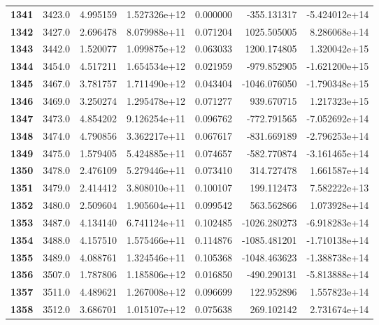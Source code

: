 \documentclass{report}[12pt]
\begin{document}
\begin{center}
\begin{tabular}{lrrrrrr}
\textbf{1341} &         3423.0 &   4.995159 &  1.527326e+12 &    0.000000 &  -355.131317 & -5.424012e+14 \\
\textbf{1342} &         3427.0 &   2.696478 &  8.079988e+11 &    0.071204 &  1025.505005 &  8.286068e+14 \\
\textbf{1343} &         3442.0 &   1.520077 &  1.099875e+12 &    0.063033 &  1200.174805 &  1.320042e+15 \\
\textbf{1344} &         3454.0 &   4.517211 &  1.654534e+12 &    0.021959 &  -979.852905 & -1.621200e+15 \\
\textbf{1345} &         3467.0 &   3.781757 &  1.711490e+12 &    0.043404 & -1046.076050 & -1.790348e+15 \\
\textbf{1346} &         3469.0 &   3.250274 &  1.295478e+12 &    0.071277 &   939.670715 &  1.217323e+15 \\
\textbf{1347} &         3473.0 &   4.854202 &  9.126254e+11 &    0.096762 &  -772.791565 & -7.052692e+14 \\
\textbf{1348} &         3474.0 &   4.790856 &  3.362217e+11 &    0.067617 &  -831.669189 & -2.796253e+14 \\
\textbf{1349} &         3475.0 &   1.579405 &  5.424885e+11 &    0.074657 &  -582.770874 & -3.161465e+14 \\
\textbf{1350} &         3478.0 &   2.476109 &  5.279446e+11 &    0.073410 &   314.727478 &  1.661587e+14 \\
\textbf{1351} &         3479.0 &   2.414412 &  3.808010e+11 &    0.100107 &   199.112473 &  7.582222e+13 \\
\textbf{1352} &         3480.0 &   2.509604 &  1.905604e+11 &    0.099542 &   563.562866 &  1.073928e+14 \\
\textbf{1353} &         3487.0 &   4.134140 &  6.741124e+11 &    0.102485 & -1026.280273 & -6.918283e+14 \\
\textbf{1354} &         3488.0 &   4.157510 &  1.575466e+11 &    0.114876 & -1085.481201 & -1.710138e+14 \\
\textbf{1355} &         3489.0 &   4.088761 &  1.324546e+11 &    0.105368 & -1048.463623 & -1.388738e+14 \\
\textbf{1356} &         3507.0 &   1.787806 &  1.185806e+12 &    0.016850 &  -490.290131 & -5.813888e+14 \\
\textbf{1357} &         3511.0 &   4.489621 &  1.267008e+12 &    0.096699 &   122.952896 &  1.557823e+14 \\
\textbf{1358} &         3512.0 &   3.686701 &  1.015107e+12 &    0.075638 &   269.102142 &  2.731674e+14 \\

\end{tabular}
\end{center}
\end{document}
